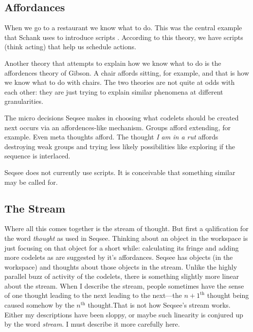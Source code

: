 \documentclass[letterpaper]{article}
\begin{document}
\subsection{Affordances}
\label{sec:affordances}

When we go to a restaurant we know what to do.  This was the central example that Schank uses to introduce scripts \cite{Schank+Abelson}.  According to this theory, we have scripts (think acting) that help us schedule actions. 

 Another theory that attempts to explain how we know what to do is the affordences theory of Gibson. A chair affords sitting, for example, and that is how we know what to do with chairs.  The two theories are not quite at odds with each other: they are just trying to explain similar phenomena at different granularities.

The micro decisions Seqsee makes in choosing what codelets should be created next occurs via an affordences-like mechanism. Groups afford extending, for example.  Even meta thoughts afford.  The thought \emph{I am in a rut} affords destroying weak groups and trying less likely possibilities like exploring if the sequence is interlaced.

Seqsee does not currently use scripts.  It is conceivable that something similar may be called for. 

\subsection{The Stream}
\label{sec:stream}

Where all this comes together is the stream of thought. But first a qalification for the word \emph{thought} as used in Seqsee. Thinking about an object in the workspace is just focusing on that object for a short while: calculating its fringe and adding more codelets as are suggested by it's affordances. Seqsee has objects (in the workspace) and thoughts about those objects in the stream.  Unlike the highly parallel buzz of activity of the codelets, there is something slightly more linear about the stream.  When I describe the stream, people sometimes have the sense of one thought leading to the next leading to the next---the $n+1^{\mathrm{th}}$ thought being caused somehow by the $n^\mathrm{th}$ thought.That is not how Seqsee's stream works. Either my descriptions have been sloppy, or maybe such linearity is conjured up by the word \emph{stream}. I must describe it more carefully here.
\end{document}
